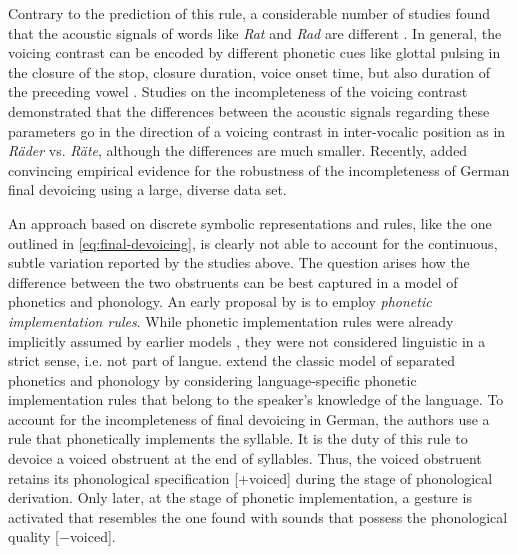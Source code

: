 Contrary to the prediction of this rule, a considerable number of studies found that the acoustic signals of words like \emph{Rat} and \emph{Rad} are different \citep{DinnsenGarciaZamor1971, PortODell1985, CharlesLuce1985, PortCrawford1989, ErnestusBaayen2006, Roettgeretal2014}. In general, the voicing contrast can be encoded by different phonetic cues like glottal pulsing in the closure of the stop, closure duration, voice onset time, but also duration of the preceding vowel \citep{Lisker1986}. Studies on the incompleteness of the voicing contrast demonstrated that the differences between the acoustic signals regarding these parameters go in the direction of a voicing contrast in inter-vocalic position as in \emph{Räder} vs. \emph{Räte}, although the differences are much smaller. Recently, \cite{RoettgerBaerHenney2019} added convincing empirical evidence for the robustness of the incompleteness of German final devoicing using a large, diverse data set.

An approach based on discrete symbolic representations and rules, like the one outlined in \ref{eq:final-devoicing}, is clearly not able to account for the continuous, subtle variation reported by the studies above. The question arises how the difference between the two obstruents can be best captured in a model of phonetics and phonology. An early proposal by \cite{PortODell1985} is to employ \emph{phonetic implementation rules}. While phonetic implementation rules were already implicitly assumed by earlier models \citep[like][]{ChomskyHalle1968, JacobsonFantHalle1952}, they were not considered linguistic in a strict sense, i.e. not part of langue. \cite{PortODell1985} extend the classic model of separated phonetics and phonology by considering language-specific phonetic implementation rules that belong to the speaker's knowledge of the language. To account for the incompleteness of final devoicing in German, the authors use a rule that phonetically implements the syllable. It is the duty of this rule to devoice a voiced obstruent at the end of syllables. Thus, the voiced obstruent retains its phonological specification [+voiced] during the stage of phonological derivation. Only later, at the stage of phonetic implementation, a gesture is activated that resembles the one found with sounds that possess the phonological quality [$-$voiced]. 

